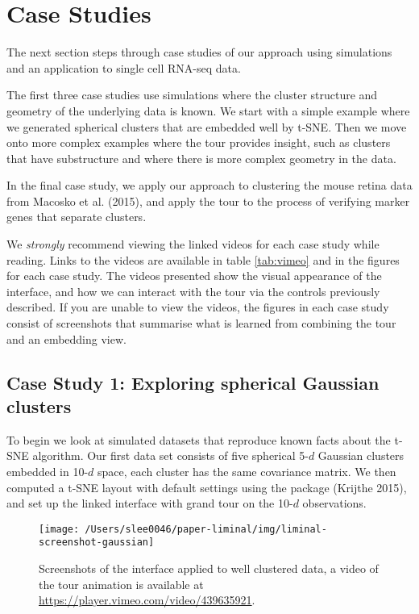 \documentclass[article,notitle]{jdssv}
\begin{document}
\hypertarget{case-studies}{%
\section{Case Studies}\label{case-studies}}

The next section steps through case studies of our approach using simulations
and an application to single cell RNA-seq data.

The first three case studies use simulations where the cluster structure and
geometry of the underlying data is known. We start with a simple example
where we generated spherical clusters that are embedded well by t-SNE. Then
we move onto more complex examples where the tour provides insight, such
as clusters that have substructure and where there is more complex geometry
in the data.

In the final case study, we apply our approach to clustering
the mouse retina data from Macosko et al. (2015), and apply the tour
to the process of verifying marker genes that separate clusters.

We \emph{strongly} recommend viewing the linked videos for each case study
while reading. Links to the videos are available in table \ref{tab:vimeo}
and in the figures for each case study. The videos presented show the visual
appearance of the  interface, and how we can interact with the tour
via the controls previously described. If you are unable to view the videos,
the figures in each case study consist of screenshots that summarise what is
learned from combining the tour and an embedding view.

\hypertarget{case-study-1-exploring-spherical-gaussian-clusters}{%
\subsection{Case Study 1: Exploring spherical Gaussian clusters}\label{case-study-1-exploring-spherical-gaussian-clusters}}

To begin we look at simulated datasets that reproduce known facts
about the t-SNE algorithm. Our first data set consists of five spherical 5-\(d\)
Gaussian clusters embedded in 10-\(d\) space, each cluster has the same
covariance matrix. We then computed a t-SNE layout with default settings
using the  package (Krijthe 2015),
and set up the  linked interface with grand tour on the 10-\(d\)
observations.



\begin{figure}

{\centering \texttt{[image: /Users/slee0046/paper-liminal/img/liminal-screenshot-gaussian]} 

}

\caption{Screenshots of the  interface applied to well clustered data, a video of the tour animation is available at \url{https://player.vimeo.com/video/439635921}.}\label{fig:gaussian}
\end{figure}
\end{document}
